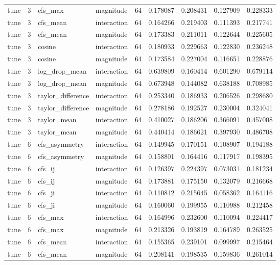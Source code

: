 \begin{tabular}{lrllrrrrr}
tune & 3 & cfs_max & magnitude & 64 & 0.178087 & 0.208431 & 0.127909 & 0.228333 \\
tune & 3 & cfs_mean & interaction & 64 & 0.164266 & 0.219403 & 0.111393 & 0.217741 \\
tune & 3 & cfs_mean & magnitude & 64 & 0.173383 & 0.211011 & 0.122644 & 0.225605 \\
tune & 3 & cosine & interaction & 64 & 0.180933 & 0.229663 & 0.122830 & 0.236248 \\
tune & 3 & cosine & magnitude & 64 & 0.173584 & 0.227004 & 0.116651 & 0.228876 \\
tune & 3 & log_drop_mean & interaction & 64 & 0.639809 & 0.160414 & 0.601290 & 0.679114 \\
tune & 3 & log_drop_mean & magnitude & 64 & 0.673948 & 0.144082 & 0.638188 & 0.708985 \\
tune & 3 & taylor_difference & interaction & 64 & 0.253340 & 0.186933 & 0.206526 & 0.298680 \\
tune & 3 & taylor_difference & magnitude & 64 & 0.278186 & 0.192527 & 0.230004 & 0.324041 \\
tune & 3 & taylor_mean & interaction & 64 & 0.410027 & 0.186206 & 0.366091 & 0.457008 \\
tune & 3 & taylor_mean & magnitude & 64 & 0.440414 & 0.186621 & 0.397930 & 0.486708 \\
tune & 6 & cfs_asymmetry & interaction & 64 & 0.149945 & 0.170151 & 0.108907 & 0.194188 \\
tune & 6 & cfs_asymmetry & magnitude & 64 & 0.158801 & 0.164416 & 0.117917 & 0.198395 \\
tune & 6 & cfs_ij & interaction & 64 & 0.126397 & 0.224397 & 0.073031 & 0.181234 \\
tune & 6 & cfs_ij & magnitude & 64 & 0.173881 & 0.175150 & 0.132079 & 0.216668 \\
tune & 6 & cfs_ji & interaction & 64 & 0.110812 & 0.215645 & 0.058362 & 0.164116 \\
tune & 6 & cfs_ji & magnitude & 64 & 0.160060 & 0.199955 & 0.110988 & 0.212458 \\
tune & 6 & cfs_max & interaction & 64 & 0.164996 & 0.232600 & 0.110094 & 0.224417 \\
tune & 6 & cfs_max & magnitude & 64 & 0.213326 & 0.193819 & 0.164789 & 0.263525 \\
tune & 6 & cfs_mean & interaction & 64 & 0.155365 & 0.239101 & 0.099997 & 0.215464 \\
tune & 6 & cfs_mean & magnitude & 64 & 0.208141 & 0.198535 & 0.159836 & 0.261014 \\

\end{tabular}
